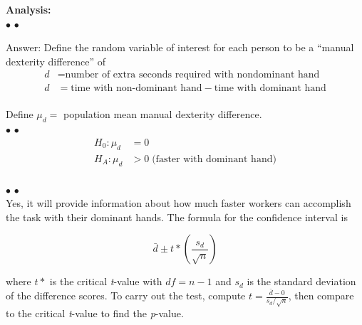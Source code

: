 \documentclass[twoside,openany]{tufte-book}
\begin{document}
\vspace{20pt}
\noindent \textbf{Analysis:}\\
\vspace{8pt}
\noindent $\bullet$  $\bullet$ \\
\vspace{5pt}

Answer: Define the random variable of interest for each person to be a ``manual dexterity difference'' of 
\begin{equation*}
\begin{split}
d &= \textrm{number of extra seconds required with nondominant hand} \\
d   &= \textrm{time with non-dominant hand} - \textrm{time with dominant hand}\\
\end{split}
\end{equation*}

Define $\mu_d =$ population mean manual dexterity difference.\\

\vspace{18pt}
\noindent $\bullet$  $\bullet$
\begin{equation*}
\begin{split}
H_0 : \mu_d &= 0\\
H_A: \mu_d &> 0  \; \textrm{(faster with dominant hand)}\\
\end{split}
\end{equation*}
 
 \vspace{5pt}
\noindent $\bullet$  $\bullet$ \\
\vspace{5pt}
Yes, it will provide information about how much faster workers can accomplish the task with their dominant hands. The formula for the confidence interval is 

\begin{equation*}
\bar{d} \pm t*\left(\frac{s_d}{\sqrt{n}}\right)
\end{equation*}
 
where $t*$ is the critical \textit{t}-value with $df = n-1$ and $s_d$ is the standard deviation of the difference scores. 
To carry out the test, compute $t=\frac{\bar{d}-0}{s_d/\sqrt{n}}$, then compare to the critical \textit{t}-value to find the \textit{p}-value. 
\end{document}
